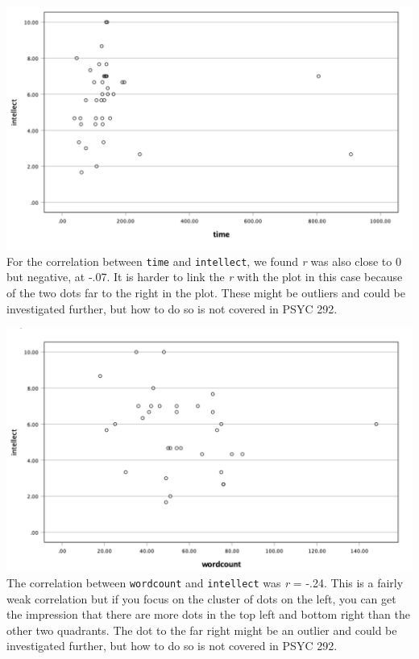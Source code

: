 \documentclass[
]{book}
\begin{document}
\includegraphics{img/7.4.32.png}
For the correlation between \texttt{time} and \texttt{intellect}, we found \emph{r} was also close to 0 but negative, at -.07. It is harder to link the \emph{r} with the plot in this case because of the two dots far to the right in the plot. These might be outliers and could be investigated further, but how to do so is not covered in PSYC 292.

\includegraphics{img/7.4.33.png}
The correlation between \texttt{wordcount} and \texttt{intellect} was \emph{r} = -.24. This is a fairly weak correlation but if you focus on the cluster of dots on the left, you can get the impression that there are more dots in the top left and bottom right than the other two quadrants. The dot to the far right might be an outlier and could be investigated further, but how to do so is not covered in PSYC 292.
\end{document}
